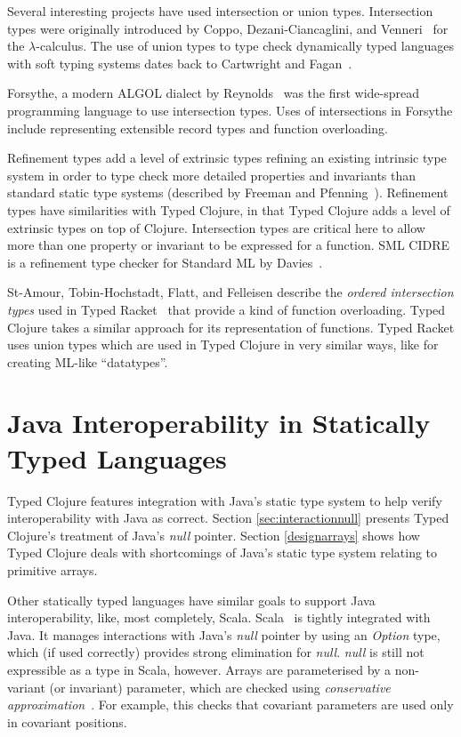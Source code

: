 Several interesting projects have used intersection or union types.
Intersection types were originally introduced by Coppo, Dezani-Ciancaglini, and Venneri~\cite{CDV81}
for the $\lambda$-calculus.
The use of union types to type check dynamically typed languages with soft typing systems
dates back to Cartwright and Fagan~\cite{CF91}.

Forsythe, a modern ALGOL dialect by Reynolds~\cite{Rey81,Rey96} was the first wide-spread 
programming language to use intersection types.
Uses of intersections in Forsythe include representing extensible record types
and function overloading.

Refinement types add a level of extrinsic types refining an existing intrinsic type system
in order to type check more detailed properties and invariants than standard static type systems
(described by Freeman and Pfenning~\cite{FP91}).
Refinement types have similarities with Typed Clojure, in that Typed Clojure
adds a level of extrinsic types on top of Clojure.
Intersection types are critical here to allow more than one property or invariant
to be expressed for a function.
SML CIDRE is a refinement type checker for Standard ML by Davies~\cite{Dav05}.

St-Amour, Tobin-Hochstadt, Flatt, and Felleisen
describe the \emph{ordered intersection types} used in Typed Racket~\cite{St12}
that provide a kind of function overloading.
Typed Clojure takes a similar approach for its representation of functions.
Typed Racket uses union types which are used in Typed Clojure in very similar ways,
like for creating ML-like ``datatypes''.

\section{Java Interoperability in Statically Typed Languages}

Typed Clojure features integration with Java's static type system
to help verify interoperability with Java as correct.
Section \ref{sec:interactionnull} presents Typed Clojure's treatment of
Java's \emph{null} pointer. 
Section \ref{designarrays} shows how Typed Clojure deals with shortcomings
of Java's static type system relating to primitive arrays.

Other statically typed languages have similar goals
to support Java interoperability, like, most completely, Scala.
Scala~\cite{OCD+} is tightly integrated with Java. It manages interactions
with Java's \emph{null} pointer by using an \emph{Option} type, which (if
used correctly) provides strong elimination for \emph{null}.
\emph{null} is still not expressible as a type in Scala, however.
Arrays are parameterised by a non-variant (or invariant) parameter,
which are checked using \emph{conservative approximation}~\cite{OSV08}. For example,
this checks that covariant parameters are used only in covariant positions.

